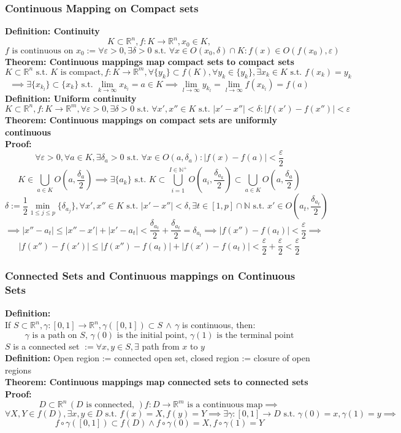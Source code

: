 \documentclass{article}
\newcommand{\R}{\mathbb{R}}
\newcommand{\N}{\mathbb{N}}
\newcommand{\st}{\mbox{ s.t. }}
\newcommand{\0}{{\bf{0}}}
\begin{document}
\subsubsection{Continuous Mapping on Compact sets}
\textbf{Definition: Continuity}
$$K\subset\R^n,f:K\to\R^n,x_0\in K,$$
$$f\mbox{ is continuous on }x_0:=\forall\varepsilon>0,\exists\delta>0\st\forall x\in O(x_0,\delta)\cap K:f(x)\in O(f(x_0),\varepsilon)$$
\textbf{Theorem: Continuous mappings map compact sets to compact sets}
$$K\subset\R^n\st K\mbox{ is compact},f: K\to\R^m,\forall\{y_k\}\subset f(K),\forall y_k\in\{y_k\},\exists x_k\in K\st f(x_k)=y_k$$
$$\implies\exists\{x_{k_l}\}\subset\{x_k\}\st\lim_{k\to\infty}x_{k_l}=a\in K\implies \lim_{l\to\infty}y_{k_l}=\lim_{l\to\infty}f(x_{k_l})=f(a)$$
\textbf{Definition: Uniform continuity}
$$K\subset\R^n,f:K\to\R^m,\forall\varepsilon>0,\exists\delta>0\st\forall x',x''\in K\st|x'-x''|<\delta:|f(x')-f(x'')|<\varepsilon$$
\textbf{Theorem: Continuous mappings on compact sets are uniformly continuous}\\
\textbf{Proof:}
$$\forall\varepsilon>0,\forall a\in K,\exists\delta_a>0\st\forall x\in O(a,\delta_a):|f(x)-f(a)|<\frac{\varepsilon}{2}$$
$$K\in\bigcup_{a\in K}O\left(a,\frac{\delta_a}{2}\right)\implies\exists\{a_k\}\st K\subset\bigcup_{i=1}^{I\in\N^+} O\left(a_i,\frac{\delta_{a_k}}{2}\right)\subset\bigcup_{a\in K}O\left(a,\frac{\delta_a}{2}\right)$$
$$\delta:=\frac{1}{2}\min_{1\le j\le p}\{\delta_{a_j}\},\forall x',x''\in K\st|x'-x''|<\delta,\exists t\in[1,p]\cap\N\st x'\in O\left(a_t,\frac{\delta_{a_t}}{2}\right)$$
$$\implies |x''-a_t|\le|x''-x'|+|x'-a_t|<\frac{\delta_{a_t}}{2}+\frac{\delta_{a_t}}{2}=\delta_{a_t}\implies|f(x'')-f(a_t)|<\frac{\varepsilon}{2}\implies$$
$$|f(x'')-f(x')|\le|f(x'')-f(a_t)|+|f(x')-f(a_t)|<\frac{\varepsilon}{2}+\frac{\varepsilon}{2}<\frac{\varepsilon}{2}$$
\subsubsection{Connected Sets and Continuous mappings on Continuous Sets}
\textbf{Definition:}\\
If $S\subset\R^n,\gamma:[0,1]\to\R^n,\gamma([0,1])\subset S\,\land\,\gamma$ is continuous, then:
$$\gamma\mbox{ is a path on }S,\,\gamma(0)\mbox{ is the initial point, }\gamma(1)\mbox{ is the terminal point}$$
$S$ is a connected set $:=\forall x,y\in S,\exists$ path from $x$ to $y$\\
\textbf{Definition:} Open region := connected open set, closed region := closure of open regions\\
\textbf{Theorem: Continuous mappings map connected sets to connected sets}\\
\textbf{Proof:}
$$D\subset\R^n\,(D\mbox{ is connected, })f:D\to\R^m\mbox{ is a continuous map}\implies$$
$$\forall X,Y\in f(D),\exists x,y\in D\st f(x)=X,f(y)=Y\implies\exists\gamma:[0,1]\to D\st\gamma(0)=x,\gamma(1)=y\implies$$
$$f\circ\gamma([0,1])\subset f(D)\land f\circ\gamma(0)=X,f\circ\gamma(1)=Y$$
\end{document}
